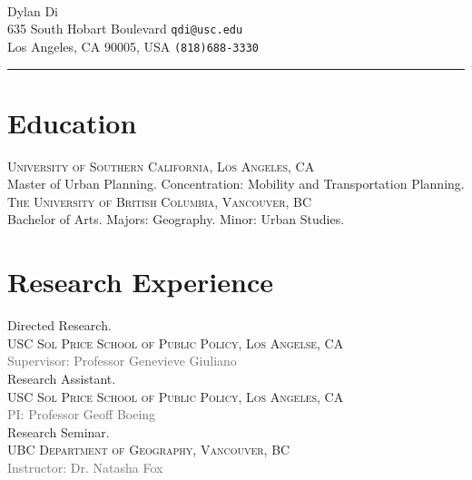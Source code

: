 \documentclass[12pt]{article}
\newcommand{\smallitem}[1]{\small\textcolor{dimgray}{#1}}
\begin{document}
\begin{leftsideheader}
\begin{flushleft}
    \hfill{\updateinfo} \\
    
    {\huge Dylan Di} \\[5pt]
    
    635 South Hobart Boulevard \hfill \texttt{qdi@usc.edu} \\
    
    Los Angeles, CA 90005, USA \hfill \texttt{(818)688-3330} \\
\end{flushleft}
{\centering\rule{7.4in}{1pt}\par}
\end{leftsideheader}

\section{Education}
\textsc{University of Southern California, Los Angeles, CA} \\ 
Master of Urban Planning. Concentration: Mobility and Transportation Planning.\\

\textsc{The University of British Columbia, Vancouver, BC} \\
Bachelor of Arts. Majors: Geography. Minor: Urban Studies.\\


\section{Research Experience}
Directed Research. \\
\textsc{USC Sol Price School of Public Policy, Los Angelse, CA}\\
\smallitem{Supervisor: Professor Genevieve Giuliano}\\


Research Assistant. \\
\textsc{USC Sol Price School of Public Policy, Los Angeles, CA} \\
\smallitem{PI: Professor Geoff Boeing}\\


Research Seminar. \\
\textsc{UBC Department of Geography, Vancouver, BC}\\
\smallitem{Instructor: Dr. Natasha Fox}\\
\end{document}
